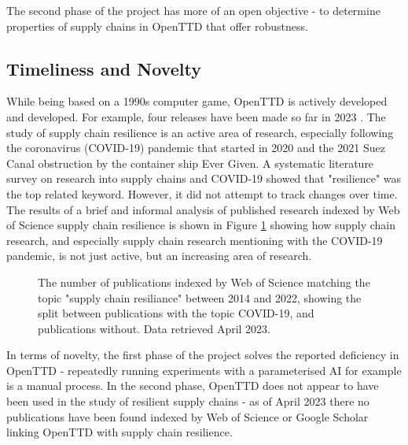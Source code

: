 \documentclass[a4paper,11pt]{article}
\begin{document}
The second phase of the project has more of an open objective - to determine properties of supply chains in OpenTTD that offer robustness.

\subsection{Timeliness and Novelty}

While being based on a 1990s computer game, OpenTTD is actively developed and developed. For example, four releases have been made so far in 2023 \cite{openttdReleases}. The study of supply chain resilience is an active area of research, especially following the coronavirus (COVID-19) pandemic that started in 2020 and the 2021 Suez Canal obstruction by the container ship Ever Given. A systematic literature survey on research into supply chains and COVID-19 \cite{moosavi_supply_2022} showed that "resilience" was the top related keyword. However, it did not attempt to track changes over time. The results of a brief and informal analysis of published research indexed by Web of Science supply chain resilience is shown in Figure \ref{fig:supplychainresiliance} showing how supply chain research, and especially supply chain research mentioning with the COVID-19 pandemic, is not just active, but an increasing area of research.

\begin{figure}[h]
\centering
{}
\caption{The number of publications indexed by Web of Science matching the topic "supply chain resiliance" between 2014 and 2022, showing the split between publications with the topic COVID-19, and publications without. Data retrieved April 2023.}
\label{fig:supplychainresiliance}
\end{figure}

In terms of novelty, the first phase of the project solves the reported deficiency in OpenTTD - repeatedly running experiments with a parameterised AI for example is a manual process. In the second phase, OpenTTD does not appear to have been used in the study of resilient supply chains - as of April 2023 there no publications have been found indexed by Web of Science or Google Scholar linking OpenTTD with supply chain resilience.
\end{document}

